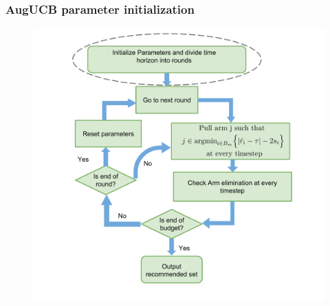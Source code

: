 
\begin{frame}
\frametitle{AugUCB parameter initialization}
\begin{figure}
\includegraphics[scale=0.24]{img/AugUCB_flow_param.png}
\end{figure}
\end{frame}


